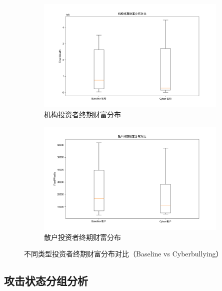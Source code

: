 \begin{figure}[htbp]
    \centering
    \begin{subfigure}[t]{0.48\textwidth}
        \centering
        \includegraphics[width=\textwidth]{image/fig4_5_final_wealth_boxplot_institutional.png}
        \caption{机构投资者终期财富分布}
        \label{fig:final_wealth_boxplot_institutional}
    \end{subfigure}
    \hfill
    \begin{subfigure}[t]{0.48\textwidth}
        \centering
        \includegraphics[width=\textwidth]{image/fig4_5_final_wealth_boxplot_retail.png}
        \caption{散户投资者终期财富分布}
        \label{fig:final_wealth_boxplot_retail}
    \end{subfigure}
    \caption{不同类型投资者终期财富分布对比（Baseline vs Cyberbullying）}
    \label{fig:final_wealth_boxplot_combined}
\end{figure}


\subsection{攻击状态分组分析}


